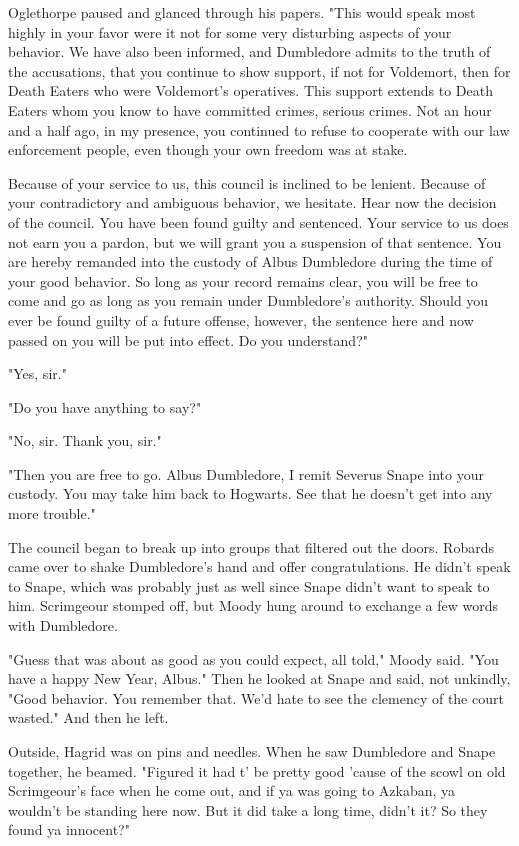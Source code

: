 Oglethorpe paused and glanced through his papers. "This would speak most highly in your favor were it not for some very disturbing aspects of your behavior. We have also been informed, and Dumbledore admits to the truth of the accusations, that you continue to show support, if not for Voldemort, then for Death Eaters who were Voldemort's operatives. This support extends to Death Eaters whom you know to have committed crimes, serious crimes. Not an hour and a half ago, in my presence, you continued to refuse to cooperate with our law enforcement people, even though your own freedom was at stake.

\textooquote Because of your service to us, this council is inclined to be lenient. Because of your contradictory and ambiguous behavior, we hesitate. Hear now the decision of the council. You have been found guilty and sentenced. Your service to us does not earn you a pardon, but we will grant you a suspension of that sentence. You are hereby remanded into the custody of Albus Dumbledore during the time of your good behavior. So long as your record remains clear, you will be free to come and go as long as you remain under Dumbledore's authority. Should you ever be found guilty of a future offense, however, the sentence here and now passed on you will be put into effect. Do you understand?"

"Yes, sir."

"Do you have anything to say?"

"No, sir. Thank you, sir."

"Then you are free to go. Albus Dumbledore, I remit Severus Snape into your custody. You may take him back to Hogwarts. See that he doesn't get into any more trouble."

The council began to break up into groups that filtered out the doors. Robards came over to shake Dumbledore's hand and offer congratulations. He didn't speak to Snape, which was probably just as well since Snape didn't want to speak to him. Scrimgeour stomped off, but Moody hung around to exchange a few words with Dumbledore.

"Guess that was about as good as you could expect, all told," Moody said. "You have a happy New Year, Albus." Then he looked at Snape and said, not unkindly, "Good behavior. You remember that. We'd hate to see the clemency of the court wasted." And then he left.

Outside, Hagrid was on pins and needles. When he saw Dumbledore and Snape together, he beamed. "Figured it had t' be pretty good 'cause of the scowl on old Scrimgeour's face when he come out, and if ya was going to Azkaban, ya wouldn't be standing here now. But it did take a long time, didn't it? So they found ya innocent?"

